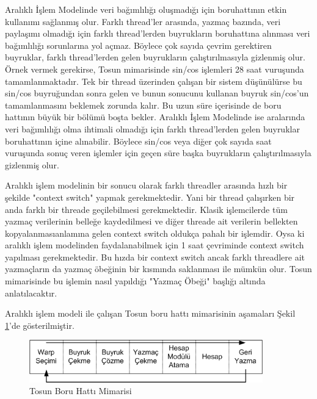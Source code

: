 Aralıklı İşlem Modelinde veri bağımlılığı oluşmadığı için boruhattının etkin kullanımı sağlanmış olur. Farklı thread’ler arasında, yazmaç bazında, veri paylaşımı olmadığı için farklı thread’lerden buyrukların boruhattına alınması veri bağımlılığı sorunlarına yol açmaz. Böylece çok sayıda çevrim gerektiren buyruklar, farklı thread’lerden gelen buyrukların çalıştırılmasıyla gizlenmiş olur. Örnek vermek gerekirse, Tosun mimarisinde sin/cos işlemleri 28 saat vuruşunda tamamlanmaktadır. Tek bir thread üzerinden çalışan bir sistem düşünülürse bu sin/cos buyruğundan sonra gelen ve bunun sonucunu kullanan buyruk sin/cos’un tamamlanmasını beklemek zorunda kalır. Bu uzun süre içerisinde de boru hattının büyük bir bölümü boşta bekler. Aralıklı İşlem Modelinde ise aralarında veri bağımlılığı olma ihtimali olmadığı için farklı thread’lerden gelen buyruklar boruhattının içine alınabilir. Böylece sin/cos veya diğer çok sayıda saat vuruşunda sonuç veren işlemler için geçen süre başka buyrukların çalıştırılmasıyla gizlenmiş olur.\par

Aralıklı işlem modelinin bir sonucu olarak farklı threadler arasında hızlı bir şekilde "context switch" yapmak gerekmektedir. Yani bir thread çalışırken bir anda farklı bir threade geçilebilmesi gerekmektedir. Klasik işlemcilerde tüm yazmaç verilerinin belleğe kaydedilmesi ve diğer threade ait verilerin bellekten kopyalanmasıanlamına gelen context switch oldukça pahalı bir işlemdir. Oysa ki aralıklı işlem modelinden faydalanabilmek için 1 saat çevriminde context switch yapılması gerekmektedir. Bu hızda bir context switch ancak farklı threadlere ait yazmaçların da yazmaç öbeğinin bir kısmında saklanması ile mümkün olur. Tosun mimarisinde bu işlemin nasıl yapıldığı "Yazmaç Öbeği" başlığı altında anlatılacaktır.\par

Aralıklı işlem modeli ile çalışan Tosun boru hattı mimarisinin aşamaları Şekil \ref{image:pipelineStages}'de gösterilmiştir.

\begin{figure}[h]
\centering
\shorthandoff{=}
\includegraphics[width=0.9\textwidth]{gorsel/pipelineStages.png}
\shorthandoff{=}
\caption{Tosun Boru Hattı Mimarisi}
\label{image:pipelineStages}
\end{figure}

